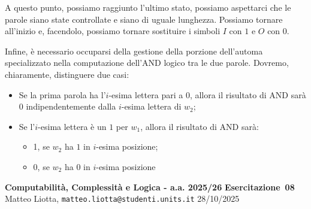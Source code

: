 \documentclass[a4paper,10pt]{article}
\makeatletter
\newcommand{\EsercitazioneNum}{08}
\newcommand{\Data}{28/10/2025}
\newcommand{\DocType}{Esercitazione} %
\newcommand{\FullTitle}{\DocType\ \EsercitazioneNum}
\newcommand{\Header}{
\noindent
  \small \textbf{Computabilità, Complessità e Logica - a.a. 2025/26} \hfill \textbf{\FullTitle} \\[0.2cm]
  \scriptsize Matteo Liotta, \texttt{matteo.liotta@studenti.units.it} \hfill \Data \\[0.2cm]
  \noindent\makebox[\linewidth]{\rule{\linewidth}{0.4pt}} \\[0.3cm]}
\newcommand{\NewPageHeader}{
  \vfill
  \noindent\makebox[\linewidth]{\rule{\linewidth}{0.4pt}}
  \newpage
  {\Header}
}
\makeatother
\begin{document}
{\begin{itemize}[label=, leftmargin=0pt]
\begin{osservazioni}
\begin{center}
\begin{tikzpicture}
        \end{tikzpicture}
        \end{center}

        A questo punto, possiamo raggiunto l'ultimo stato, possiamo aspettarci che le parole siano state controllate e siano di uguale lunghezza. Possiamo tornare all'inizio e, facendolo, possiamo tornare sostituire i simboli $I$ con $1$ e $O$ con $0$. 

    
        \begin{center}
        \end{center}
        
        Infine, è necessario occuparsi della gestione della porzione dell'automa specializzato nella computazione dell'AND logico tra le due parole. Dovremo, chiaramente, distinguere due casi: \begin{itemize}
            \item Se la prima parola ha l'$i$-esima lettera pari a $0$, allora il risultato di AND sarà 0 indipendentemente dalla $i$-esima lettera di $w_2$;
            \item Se l'$i$-esima lettera è un $1$ per $w_1$, allora il risultato di AND sarà:
            \begin{itemize}
                \item 1, se $w_2$ ha $1$ in $i$-esima posizione;
                \item 0, se $w_2$ ha $0$ in $i$-esima posizione
            \end{itemize}
        \end{itemize}
    \end{osservazioni}
    
    \NewPageHeader


\end{itemize}}
\end{document}
